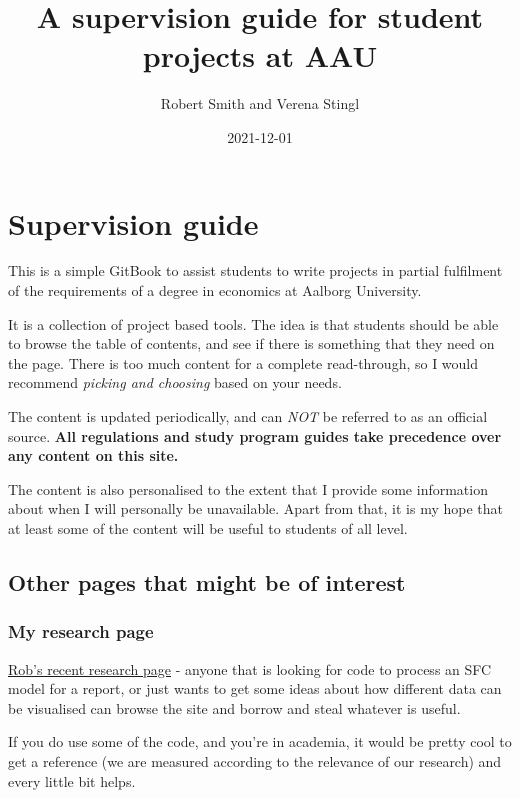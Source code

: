 \documentclass[
]{book}
\title{A supervision guide for student projects at AAU}
\author{Robert Smith and Verena Stingl}
\date{2021-12-01}
\begin{document}
\maketitle

{
\setcounter{tocdepth}{1}
\tableofcontents
}
\hypertarget{supervision-guide}{%
\chapter{Supervision guide}\label{supervision-guide}}

This is a simple GitBook to assist students to write projects in partial fulfilment of the requirements of a degree in economics at Aalborg University.

It is a collection of project based tools. The idea is that students should be able to browse the table of contents, and see if there is something that they need on the page. There is too much content for a complete read-through, so I would recommend \emph{picking and choosing} based on your needs.

The content is updated periodically, and can \emph{NOT} be referred to as an official source. \textbf{All regulations and study program guides take precedence over any content on this site.}

The content is also personalised to the extent that I provide some information about when I will personally be unavailable. Apart from that, it is my hope that at least some of the content will be useful to students of all level.

\hypertarget{other-pages-that-might-be-of-interest}{%
\section{Other pages that might be of interest}\label{other-pages-that-might-be-of-interest}}

\hypertarget{my-research-page}{%
\subsection{My research page}\label{my-research-page}}

\href{https://robabsmith.github.io/research_page/}{Rob's recent research page} - anyone that is looking for code to process an SFC model for a report, or just wants to get some ideas about how different data can be visualised can browse the site and borrow and steal whatever is useful.

If you do use some of the code, and you're in academia, it would be pretty cool to get a reference (we are measured according to the relevance of our research) and every little bit helps.
\end{document}
